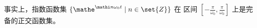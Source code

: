 \begin{remark}
    事实上，指数函数集 $\{\mathe^{\mathi n\omega_0t} \mid n \in \set{Z}\}$ 在
    区间 $[-\frac{\pi}{\omega_0}, \frac{\pi}{\omega_0}]$ 上是完备的正交函数集。
\end{remark}

